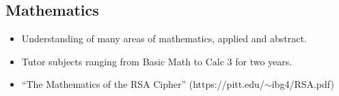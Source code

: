 \documentclass{article}
\begin{document}
    \subsection*{Mathematics}
      \begin{itemize}
        \item Understanding of many areas of mathematics, applied and abstract.
        \item Tutor subjects ranging from Basic Math to Calc 3 for two years.
        \item ``The Mathematics of the RSA Cipher'' (https://pitt.edu/$\sim$ibg4/RSA.pdf)
      \end{itemize}
    
\end{document}
